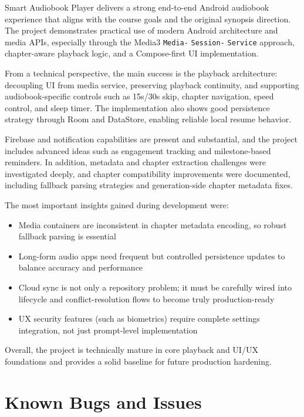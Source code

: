 \documentclass[11pt,a4paper]{article}
\begin{document}
Smart Audiobook Player delivers a strong end-to-end Android audiobook experience that aligns with the course goals and the original synopsis direction. The project demonstrates practical use of modern Android architecture and media APIs, especially through the Media3 \texttt{Media-} \texttt{Session-} \texttt{Service} approach, chapter-aware playback logic, and a Compose-first UI implementation.

From a technical perspective, the main success is the playback architecture: decoupling UI from media service, preserving playback continuity, and supporting audiobook-specific controls such as 15s/30s skip, chapter navigation, speed control, and sleep timer. The implementation also shows good persistence strategy through Room and DataStore, enabling reliable local resume behavior.

Firebase and notification capabilities are present and substantial, and the project includes advanced ideas such as engagement tracking and milestone-based reminders. In addition, metadata and chapter extraction challenges were investigated deeply, and chapter compatibility improvements were documented, including fallback parsing strategies and generation-side chapter metadata fixes.

The most important insights gained during development were:
\begin{itemize}[noitemsep]
    \item Media containers are inconsistent in chapter metadata encoding, so robust fallback parsing is essential
    \item Long-form audio apps need frequent but controlled persistence updates to balance accuracy and performance
    \item Cloud sync is not only a repository problem; it must be carefully wired into lifecycle and conflict-resolution flows to become truly production-ready
    \item UX security features (such as biometrics) require complete settings integration, not just prompt-level implementation
\end{itemize}

Overall, the project is technically mature in core playback and UI/UX foundations and provides a solid baseline for future production hardening.

\section{Known Bugs and Issues}
\end{document}
